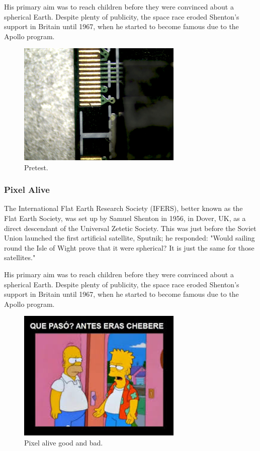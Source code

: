 His primary aim was to reach children before they were convinced about a spherical Earth. Despite plenty of publicity, the space race eroded Shenton's support in Britain until 1967, when he started to become famous due to the Apollo program.
\begin{figure}[!h]
  \centering
  \includegraphics[width=0.7\textwidth]{../images/ch7/2}
  \caption[Pretest]{Pretest.}\label{fig:vis_insp}
\end{figure}

\subsubsection{Pixel Alive}
The International Flat Earth Research Society (IFERS), better known as the Flat Earth Society, was set up by Samuel Shenton in 1956, in Dover, UK, as a direct descendant of the Universal Zetetic Society. This was just before the Soviet Union launched the first artificial satellite, Sputnik; he responded: "Would sailing round the Isle of Wight prove that it were spherical? It is just the same for those satellites."

His primary aim was to reach children before they were convinced about a spherical Earth. Despite plenty of publicity, the space race eroded Shenton's support in Britain until 1967, when he started to become famous due to the Apollo program.
\begin{figure}[!h]
  \centering
  \includegraphics[width=0.7\textwidth]{../images/ch7/3}
  \caption[Pixel alive.]{Pixel alive good and bad.}\label{fig:vis_insp}
\end{figure}

